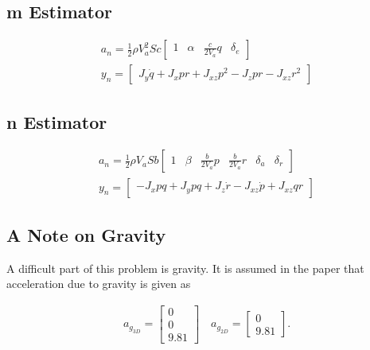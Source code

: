 \subsection{m Estimator}

\begin{align*}
    a_n = \frac{1}{2} \rho V_a^2 S c
    \begin{bmatrix}
        1 & \alpha & \frac{c}{2 V_a} q & \delta_e
    \end{bmatrix}\\
    y_n = 
    \begin{bmatrix}
        J_y \dot{q} + J_x p r + J_{xz} p^2 - J_z p r - J_{xz} r^2
    \end{bmatrix}
\end{align*}

\subsection{n Estimator}

\begin{align*}
    a_n = \frac{1}{2} \rho V_a S b
    \begin{bmatrix}
        1 & \beta & \frac{b}{2V_a} p & \frac{b}{2V_a} r & \delta_a & \delta_r
    \end{bmatrix}\\
    y_n = 
    \begin{bmatrix}
        -J_x p q + J_y p q + J_z \dot{r} - J_{xz} \dot{p} + J_{xz} q r
    \end{bmatrix}
\end{align*}

\subsection{A Note on Gravity}

A difficult part of this problem is gravity. 
It is assumed in the paper that acceleration due to gravity is given as

\begin{align}
    a_{g_{3D}} =
    \begin{bmatrix}
        0\\
        0\\
        9.81
    \end{bmatrix}
    \quad
    a_{g_{2D}} =
    \begin{bmatrix}
        0\\
        9.81
    \end{bmatrix}.
\end{align}

